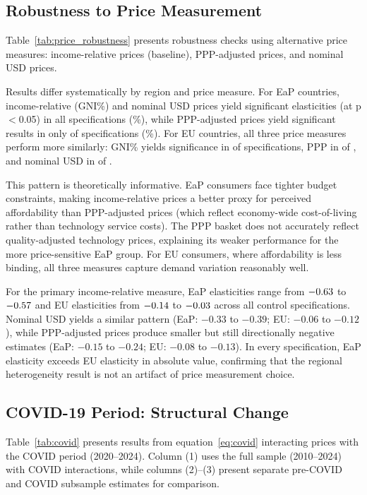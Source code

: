 \subsection{Robustness to Price Measurement}

Table~\ref{tab:price_robustness} presents robustness checks using alternative price measures: income-relative prices (baseline), PPP-adjusted prices, and nominal USD prices. 

Results differ systematically by region and price measure. For EaP countries, income-relative (GNI\%) and nominal USD prices yield significant elasticities (at p$<$0.05) in all \NPerMeasure{} specifications (\PctGNISigEaP\%), while PPP-adjusted prices yield significant results in only \CntPPPSigEaP{} of \NPerMeasure{} specifications (\PctPPPSigEaP\%). For EU countries, all three price measures perform more similarly: GNI\% yields significance in \CntGNISigEU{} of \NPerMeasure{} specifications, PPP in \CntPPPSigEU{} of \NPerMeasure{}, and nominal USD in \CntUSDSigEU{} of \NPerMeasure{}.

This pattern is theoretically informative. EaP consumers face tighter budget constraints, making income-relative prices a better proxy for perceived affordability than PPP-adjusted prices (which reflect economy-wide cost-of-living rather than technology service costs). The PPP basket does not accurately reflect quality-adjusted technology prices, explaining its weaker performance for the more price-sensitive EaP group. For EU consumers, where affordability is less binding, all three measures capture demand variation reasonably well.

For the primary income-relative measure, EaP elasticities range from $-0.63$ to $-0.57$ and EU elasticities from $-0.14$ to $-0.03$ across all \NPerMeasure{} control specifications. Nominal USD yields a similar pattern (EaP: $-0.33$ to $-0.39$; EU: $-0.06$ to $-0.12$), while PPP-adjusted prices produce smaller but still directionally negative estimates (EaP: $-0.15$ to $-0.24$; EU: $-0.08$ to $-0.13$). In every specification, EaP elasticity exceeds EU elasticity in absolute value, confirming that the regional heterogeneity result is not an artifact of price measurement choice.

\subsection{COVID-19 Period: Structural Change}

Table~\ref{tab:covid} presents results from equation~\eqref{eq:covid} interacting prices with the COVID period (2020--2024). Column (1) uses the full sample (2010--2024) with COVID interactions, while columns (2)--(3) present separate pre-COVID and COVID subsample estimates for comparison.

